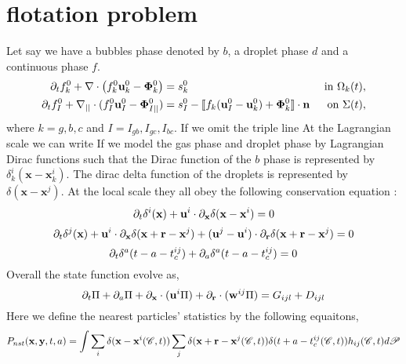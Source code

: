 \section{flotation problem}

Let say we have a bubbles phase denoted by $b$, a droplet phase $d$ and a continuous  phase $f$. 
\begin{align}
    \partial_t f_k^0
    +\mathbf{\nabla}\cdot \left(
        f_k^0\textbf{u}_k^0
        - \mathbf{\Phi}_k^0
        \right)
    &= 
    s_k^0
    & \text{ in } \Omega_k(t),&\\
    \partial_t f_I^0 
    +\mathbf{\nabla}_{||}\cdot
    (
        f_I^0 \textbf{u}_I^0
        - \mathbf{\Phi}_{I||}^0 
    )
    &= 
    s_I^0
    - \llbracket 
        f_k (\textbf{u}_I^0 - \textbf{u}_k^0)
        + \mathbf{\Phi}_k^0
      \rrbracket \cdot \textbf{n} 
    & \text{ on } \Sigma(t),&
\end{align}
where $k = g,b,c$ and $I = I_{gb},I_{gc},I_{bc}$.
If we omit the triple line At the Lagrangian scale we can write 
If we model the gas phase and droplet phase by Lagrangian Dirac functions such that the Dirac function of the $b$ phase is represented by $\delta_k^i(\textbf{x}- \textbf{x}^i_k)$. 
The dirac delta function of the droplets is represented by $\delta(\textbf{x} - \textbf{x}^j)$. 
At the local scale they all obey the following conservation equation : 
\begin{equation*}
    \partial_t \delta^i(\textbf{x})
    + \textbf{u}^i  \cdot \partial_{\textbf{x}} \delta(\textbf{x} - \textbf{x}^i)
    = 0 
\end{equation*}
\begin{equation*}
    \partial_t \delta^j(\textbf{x})
    + \textbf{u}^i \cdot \partial_{\textbf{x}}  \delta(\textbf{x} + \textbf{r} - \textbf{x}^j)
    + (\textbf{u}^j - \textbf{u}^i) \cdot \partial_{\textbf{r}}  \delta(\textbf{x} + \textbf{r} - \textbf{x}^j)
    = 0 
\end{equation*}
\begin{equation*}
    \partial_t \delta^a(t - a - t_c^{ij})
    + 
    \partial_a \delta^a(t - a - t_c^{ij})
    = 0 
\end{equation*}
Overall the state function evolve as, 
\begin{equation}
    \partial_t \Pi
    + \partial_a \Pi
    + \partial_{\textbf{x}} \cdot (\textbf{u}^i \Pi)
    + \partial_{\textbf{r}}  \cdot (\textbf{w}^{ij} \Pi)
    = G_{ijl}+D_{ijl}
\end{equation}
Here we define the nearest particles' statistics by the following equaitons,
\begin{equation}
    P_{nst}(\textbf{x},\textbf{y},t,a)= 
    \int \sum_{i}\delta(\textbf{x}-\textbf{x}^i(\mathscr{C},t))
    \sum_{j}\delta(\textbf{x}+\textbf{r}-\textbf{x}^j(\mathscr{C},t)) 
    \delta(t+a-t_c^{ij}(\mathscr{C},t)) 
    h_{ij}(\mathscr{C},t) d\mathscr{P} 
\end{equation}
